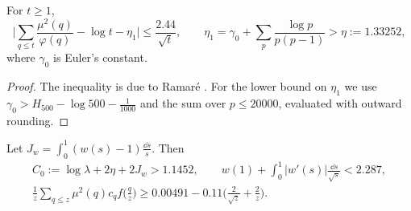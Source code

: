 \documentclass[11pt,colorlinks]{charlie}
\begin{document}
\begin{lemma}\label{lem:ramare}
For $t\ge1$,
\[
 \Big|\sum_{q\le t}\frac{\mu^2(q)}{\varphi(q)}-\log t-\eta_1\Big|\le\frac{2.44}{\sqrt t},\qquad\eta_1=\gamma_0+\sum_p\frac{\log p}{p(p-1)}>\eta:=1.33252,
\]
where $\gamma_0$ is Euler's constant.
\end{lemma}
\begin{proof}
The inequality is due to Ramar\'e \cite{Ramare}. For the lower bound on $\eta_1$ we use $\gamma_0>H_{500}-\log500-\frac1{1000}$ and the sum over $p\le20000$, evaluated with outward rounding.
\end{proof}

\begin{lemma}\label{lem:w-constants}
Let $J_w=\int_0^1(w(s)-1)\frac{\dd s}s$. Then
\begin{gather*}
 C_0:=\log\lambda+2\eta+2J_w>1.1452,\qquad w(1)+\int_0^1|w'(s)|\frac{\dd s}{\sqrt s}<2.287,\\
 \frac1z\sum_{q\le z}\mu^2(q)c_qf\Big(\frac qz\Big)\ge0.00491-0.11\Big(\frac2{\sqrt z}+\frac2z\Big).
\end{gather*}
\end{lemma}
\end{document}
